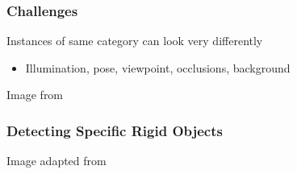 \documentclass[xetex,professionalfont]{beamer}
\begin{document}
\begin{frame}
\frametitle{Challenges}

Instances of same category can look very differently
\begin{itemize}
    \item Illumination, pose, viewpoint, occlusions, background
\end{itemize}

\begin{center}
    {\centering Image from \cite{grauman2011}}
\end{center}

\end{frame}


\begin{frame}
\frametitle{Detecting Specific Rigid Objects} %

\begin{center}
    {\centering Image adapted from \cite{brown2007}}
\end{center}

\end{frame}

\end{document}
